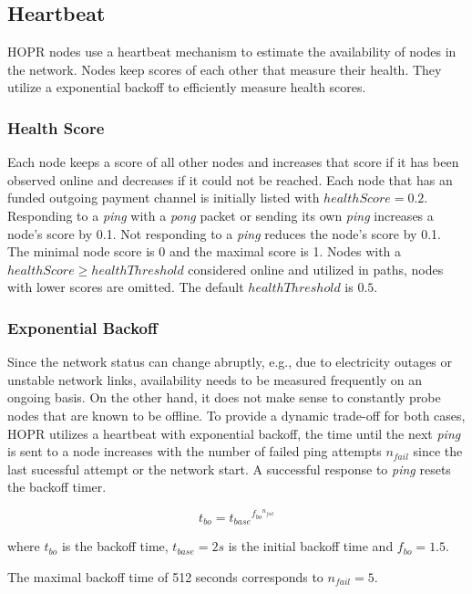 \subsection{Heartbeat}
HOPR nodes use a heartbeat mechanism to estimate the availability of nodes in the network. Nodes keep scores of each other that measure their health. They utilize a exponential backoff to efficiently measure health scores.

\subsubsection{Health Score}
Each node keeps a score of all other nodes and increases that score if it has been observed online and decreases if it could not be reached. Each node that has an funded outgoing payment channel is initially listed with $healthScore = 0.2$. Responding to a \textit{ping} with a \textit{pong} packet or sending its own \textit{ping} increases a node's score by 0.1. Not responding to a \textit{ping} reduces the node's score by 0.1. The minimal node score is 0 and the maximal score is 1. Nodes with a $healthScore \ge healthThreshold$ considered online and utilized in paths, nodes with lower scores are omitted. The default $healthThreshold$ is $0.5$.

\subsubsection{Exponential Backoff}
Since the network status can change abruptly, e.g., due to electricity outages or unstable network links, availability needs to be measured frequently on an ongoing basis. On the other hand, it does not make sense to constantly probe nodes that are known to be offline. To provide a dynamic trade-off for both cases, HOPR utilizes a heartbeat with exponential backoff, the time until the next \textit{ping} is sent to a node increases with the number of failed ping attempts $n_{fail}$ since the last sucessful attempt or the network start. A successful response to \textit{ping} resets the backoff timer.

$$ t_{bo} = {t_{base}}^{{f_{bo}}^{n_{fail}}} $$

where $t_{bo}$ is the backoff time, $t_{base} = 2s$ is the initial backoff time and $f_{bo} = 1.5$.

The maximal backoff time of 512 seconds corresponds to $n_{fail} = 5$.